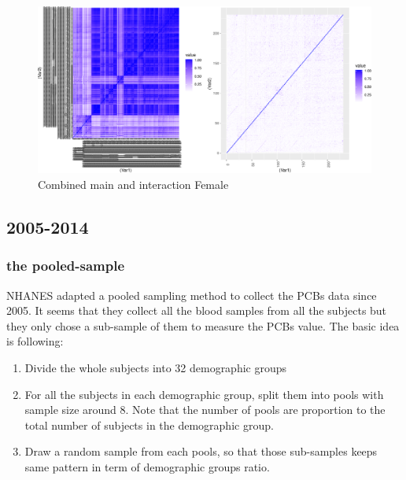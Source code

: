 \documentclass[]{article}
\providecommand{\tightlist}{%
  \setlength{\itemsep}{0pt}\setlength{\parskip}{0pt}}
\begin{document}
\begin{figure}
\centering
\includegraphics{PCBs_covariance_files/figure-latex/unnamed-chunk-14-1.pdf}
\caption{Combined main and interaction Female}
\end{figure}

\subsection{2005-2014}\label{section-1}

\subsubsection{the pooled-sample}\label{the-pooled-sample}

NHANES adapted a pooled sampling method to collect the PCBs data since
2005. It seems that they collect all the blood samples from all the
subjects but they only chose a sub-sample of them to measure the PCBs
value. The basic idea is following:

\begin{enumerate}
\def\labelenumi{\arabic{enumi}.}
\tightlist
\item
  Divide the whole subjects into 32 demographic groups\\
\item
  For all the subjects in each demographic group, split them into pools
  with sample size around 8. Note that the number of pools are
  proportion to the total number of subjects in the demographic group.\\
\item
  Draw a random sample from each pools, so that those sub-samples keeps
  same pattern in term of demographic groups ratio.
\end{enumerate}
\end{document}
